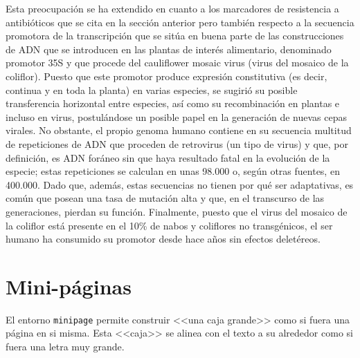 \documentclass[11pt,twoside]{article}
\begin{document}
Esta preocupación se ha extendido en cuanto a los marcadores de resistencia a antibióticos que se cita en la sección anterior pero también respecto a la secuencia promotora de la transcripción que se sitúa en buena parte de las construcciones de ADN que se introducen en las plantas de interés alimentario, denominado promotor 35S y que procede del cauliflower mosaic virus (virus del mosaico de la coliflor). Puesto que este promotor produce expresión constitutiva (es decir, continua y en toda la planta) en varias especies, se sugirió su posible transferencia horizontal entre especies, así como su recombinación en plantas e incluso en virus, postulándose un posible papel en la generación de nuevas cepas virales.
No obstante, el propio genoma humano contiene en su secuencia multitud de repeticiones de ADN que proceden de retrovirus (un tipo de virus) y que, por definición, es ADN foráneo sin que haya resultado fatal en la evolución de la especie; estas repeticiones se calculan en unas 98.000 o, según otras fuentes, en 400.000.
Dado que, además, estas secuencias no tienen por qué ser adaptativas, es común que posean una tasa de mutación alta y que, en el transcurso de las generaciones, pierdan su función. Finalmente, puesto que el virus del mosaico de la coliflor está presente en el 10\% de nabos y coliflores no transgénicos, el ser humano ha consumido su promotor desde hace años sin efectos deletéreos.







\section{Mini-páginas}

El entorno \texttt{minipage} permite construir <<una caja grande>> como si fuera una página en si misma. Esta <<caja>> se alinea con el texto a su alrededor como si fuera una letra muy grande.


\medskip

% 
\end{document}
